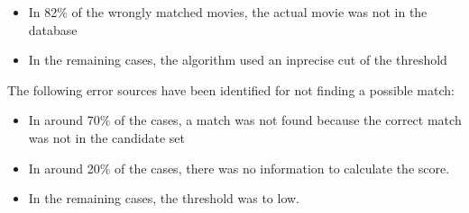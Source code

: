 \begin{itemize}
	\item In 82\% of the wrongly matched movies, the actual movie was not in the database
	\item In the remaining cases, the algorithm used an inprecise cut of the threshold
\end{itemize}

The following error sources have been identified for not finding a possible match:

\begin{itemize}
	\item In around 70\% of the cases, a match was not found because the correct match was not in the candidate set
	\item In around 20\% of the cases, there was no information to calculate the score.
	\item In the remaining cases, the threshold was to low.
\end{itemize}
